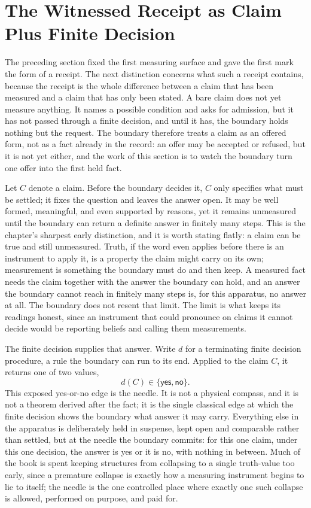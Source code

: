 \section[Witnessed Receipt]{The Witnessed Receipt as Claim Plus Finite Decision}

The preceding section fixed the first measuring surface and gave the first mark the form of a receipt. The next distinction concerns what such a receipt contains, because the receipt is the whole difference between a claim that has been measured and a claim that has only been stated. A bare claim does not yet measure anything. It names a possible condition and asks for admission, but it has not passed through a finite decision, and until it has, the boundary holds nothing but the request. The boundary therefore treats a claim as an offered form, not as a fact already in the record: an offer may be accepted or refused, but it is not yet either, and the work of this section is to watch the boundary turn one offer into the first held fact.

Let \(C\) denote a claim. Before the boundary decides it, \(C\) only specifies what must be settled; it fixes the question and leaves the answer open. It may be well formed, meaningful, and even supported by reasons, yet it remains unmeasured until the boundary can return a definite answer in finitely many steps. This is the chapter's sharpest early distinction, and it is worth stating flatly: a claim can be true and still unmeasured. Truth, if the word even applies before there is an instrument to apply it, is a property the claim might carry on its own; measurement is something the boundary must do and then keep. A measured fact needs the claim together with the answer the boundary can hold, and an answer the boundary cannot reach in finitely many steps is, for this apparatus, no answer at all. The boundary does not resent that limit. The limit is what keeps its readings honest, since an instrument that could pronounce on claims it cannot decide would be reporting beliefs and calling them measurements.

The finite decision supplies that answer. Write \(d\) for a terminating finite decision procedure, a rule the boundary can run to its end. Applied to the claim \(C\), it returns one of two values,
\[
  d(C)\in\{\mathsf{yes},\mathsf{no}\}.
\]
This exposed yes-or-no edge is the needle. It is not a physical compass, and it is not a theorem derived after the fact; it is the single classical edge at which the finite decision shows the boundary what answer it may carry. Everything else in the apparatus is deliberately held in suspense, kept open and comparable rather than settled, but at the needle the boundary commits: for this one claim, under this one decision, the answer is yes or it is no, with nothing in between. Much of the book is spent keeping structures from collapsing to a single truth-value too early, since a premature collapse is exactly how a measuring instrument begins to lie to itself; the needle is the one controlled place where exactly one such collapse is allowed, performed on purpose, and paid for.

